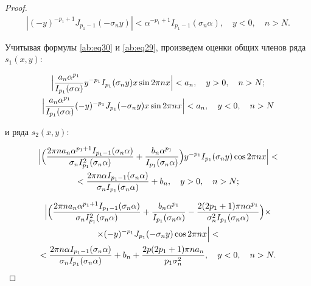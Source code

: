 \begin{proof}
\begin{gather}
\label{ab:eq32}

\left|(-y)^{-p_1+1}J_{p_1-1}(-\sigma_ny)\right|<\alpha^{-p_1+1}I_{p_1-1}(\sigma_n\alpha),\quad y<0,\quad n>N.

\end{gather}



Учитывая формулы \eqref{ab:eq30} и \eqref{ab:eq29}, произведем оценки общих членов ряда $s_1(x,y)$:

\begin{gather}

\label{ab:eq33}

\Bigl|\frac{a_n\alpha^{p_1}}{I_{p_1}(\sigma\alpha)}y^{-p_1}I_{p_1}(\sigma_ny)x\sin2\pi nx\Bigr|<a_n,\quad y>0, \quad n> N;

\\

\label{ab:eq38}

\Bigl|\frac{a_n\alpha^{p_1}}{I_{p_1}(\sigma\alpha)}(-y)^{-p_1}J_{p_1}(-\sigma_ny)x\sin2\pi nx\Bigr|<a_n,\quad y<0,\quad n>N

\end{gather}

и ряда $s_2(x,y)$:

\begin{multline}

\label{ab:eq38}

\Bigl|\Bigl(\frac{2\pi na_n\alpha^{p_1+1}I_{p_1-1}(\sigma_n\alpha)}{\sigma_nI_{p_1}^2(\sigma_n\alpha)}+\frac{b_n\alpha^{p_1}}{I_{p_1}(\sigma_n\alpha)}\Bigr)y^{-p_1}I_{p_1}(\sigma_ny)\cos2\pi nx\Bigr|<\\

<\frac{2\pi n\alpha I_{p_1-1}(\sigma_n\alpha)}{\sigma_n I_{p_1}(\sigma_n\alpha)}+b_n,\quad y>0, \quad n >N;

\end{multline}

\begin{multline}

\label{ab:eq38}

\Bigl|\Bigl(\frac{2\pi na_n\alpha^{p_1+1}I_{p_1-1}(\sigma_n\alpha)}{\sigma_nI_{p_1}^2(\sigma_n\alpha)}+\frac{b_n\alpha^{p_1}}{I_{p_1}(\sigma_n\alpha)}-\frac{2(2p_1+1)\pi n\alpha^{p_1}}{\sigma_n^2I_{p_1}(\sigma_n\alpha)}\Bigr) \times \\

\times (-y)^{-p_1}J_{p_1}(-\sigma_ny)\cos2\pi nx\Bigr|<\\

<\frac{2\pi n\alpha I_{p_1-1}(\sigma_n\alpha)}{\sigma_n I_{p_1}(\sigma_n\alpha)}+b_n+\frac{2p(2p_1+1)\pi na_n}{p_1\sigma_n^2},\quad y<0,\quad n>N .


\end{multline}
\end{proof}
